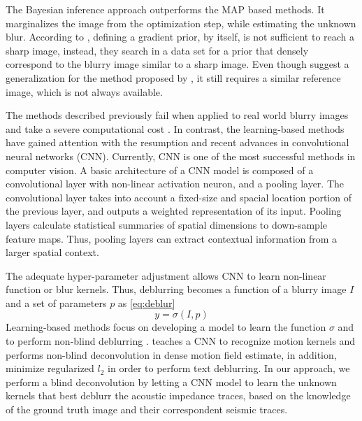 \documentclass[journal]{IEEEtran}
\begin{document}
The Bayesian inference approach \cite{Levin} outperforms the MAP based
methods. It marginalizes the image from the optimization step, while
estimating the unknown blur. 
According to \cite{Hacohen13}, defining a gradient prior, by itself,
is not sufficient to reach a sharp image, instead, they search in a data
set for a prior that densely correspond to the blurry image similar
to a sharp image. Even though \cite{Pan2014} suggest a generalization
for the method proposed by \cite{Hacohen13}, it still requires a similar
reference image, which is not always available.

The methods described previously fail when applied to real world
blurry images \cite{Lai2016} and take a severe computational cost
\cite{Chakrabarti2016}. In contrast, the learning-based methods
have gained attention with the resumption and recent advances in
convolutional neural networks (CNN). 
Currently, CNN is one of the most successful methods in computer vision.
A basic architecture of a CNN model is composed of a convolutional layer
with non-linear activation neuron, and a pooling layer.
The convolutional layer takes into account a fixed-size and spacial
location portion of the previous layer, and outputs
a weighted representation of its input.
Pooling layers calculate statistical summaries of spatial dimensions
to down-sample feature maps. Thus, pooling layers can extract
contextual information from a larger spatial context.

The adequate hyper-parameter adjustment allows CNN to learn non-linear
function or blur kernels. Thus, deblurring becomes a function of
a blurry image $I$ and a set of parameters $p$ as \ref{eq:deblur}
\begin{equation}
 y = \sigma(I,p)
 \label{eq:deblur}
\end{equation}
Learning-based methods focus on developing a model to learn the function
$\sigma$ and to perform non-blind deblurring \cite{Chakrabarti2016}.
\cite{Sun2015} teaches a CNN to recognize motion kernels and performs non-blind
deconvolution in dense motion field estimate, in addition, \cite{Hradis2015}
minimize regularized $l_2$ in order to perform text deblurring.
In our approach, we perform a blind deconvolution by letting a CNN model
to learn the unknown kernels that best deblurr the acoustic impedance
traces, based on the knowledge of the ground truth image and their
correspondent seismic traces.
\end{document}
